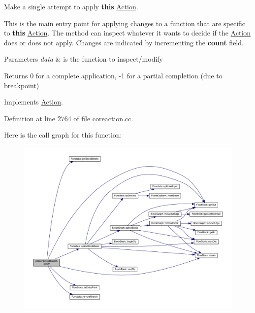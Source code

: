 Make a single attempt to apply {\bfseries{this}} \mbox{\hyperlink{class_action}{Action}}. 

This is the main entry point for applying changes to a function that are specific to {\bfseries{this}} \mbox{\hyperlink{class_action}{Action}}. The method can inspect whatever it wants to decide if the \mbox{\hyperlink{class_action}{Action}} does or does not apply. Changes are indicated by incrementing the {\bfseries{count}} field. 
\begin{DoxyParams}{Parameters}
{\em data} & is the function to inspect/modify \\
\hline
\end{DoxyParams}
\begin{DoxyReturn}{Returns}
0 for a complete application, -\/1 for a partial completion (due to breakpoint) 
\end{DoxyReturn}


Implements \mbox{\hyperlink{class_action_aac1c3999d6c685b15f5d9765a4d04173}{Action}}.



Definition at line 2764 of file coreaction.\+cc.

Here is the call graph for this function\+:
\nopagebreak
\begin{figure}[H]
\begin{center}
\leavevmode
\includegraphics[width=350pt]{class_action_redund_branch_ac7caec1379a7cb37fba45fe2bd75199f_cgraph}
\end{center}
\end{figure}
\mbox{\label{class_action_redund_branch_a116163afe83810fd44a1137ee040718a}} 

